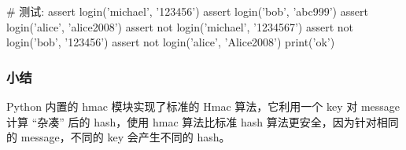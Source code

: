 \begin{pythoncode}
# 测试:
assert login('michael', '123456')
assert login('bob', 'abc999')
assert login('alice', 'alice2008')
assert not login('michael', '1234567')
assert not login('bob', '123456')
assert not login('alice', 'Alice2008')
print('ok')
\end{pythoncode}

\hypertarget{ux5c0fux7ed3}{%
\subsubsection{小结}\label{ux5c0fux7ed3}}

Python 内置的 hmac 模块实现了标准的 Hmac 算法，它利用一个 key 对 message
计算 ``杂凑'' 后的 hash，使用 hmac 算法比标准 hash
算法更安全，因为针对相同的 message，不同的 key 会产生不同的 hash。

